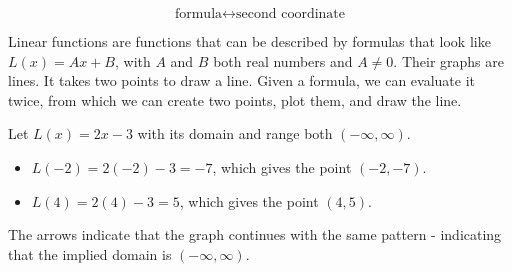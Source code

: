 \documentclass{ximera}
\begin{document}
\[ \text{formula} \leftrightarrow \text{second coordinate} \]









\begin{example}

Linear functions are functions that can be described by formulas that look like $L(x) = A x + B$, with $A$ and $B$ both real numbers and $A \ne 0$.  Their graphs are lines.  It takes two points to draw a line. Given a formula, we can evaluate it twice, from which we can create two points, plot them, and draw the line.

Let $L(x) = 2x-3$ with its domain and range both $(-\infty, \infty)$.

\begin{itemize}
\item $L(-2) = 2(-2) - 3 = -7$, which gives the point $(-2, -7)$.
\item $L(4) = 2(4) - 3 = 5$, which gives the point $(4, 5)$.
\end{itemize}






\begin{image}
\end{image}

The arrows indicate that the graph continues with the same pattern - indicating that the implied domain is $(-\infty, \infty)$.


\end{example}
\end{document}
